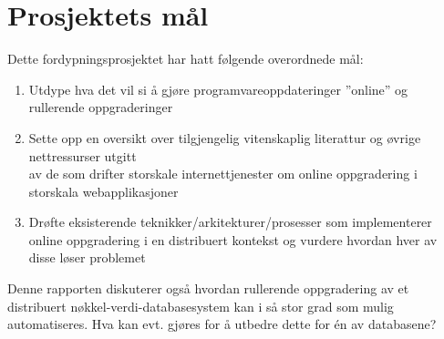 \section{Prosjektets mål}

Dette fordypningsprosjektet har hatt følgende overordnede mål:

\begin{enumerate}
  \item Utdype hva det vil si å gjøre programvareoppdateringer ''online'' og rullerende oppgraderinger %
  \item Sette opp en oversikt over tilgjengelig vitenskaplig literattur og øvrige nettressurser utgitt \\ av de som drifter storskale internettjenester om online oppgradering i storskala webapplikasjoner
  \item Drøfte eksisterende teknikker/arkitekturer/prosesser som implementerer \\ online oppgradering i en distribuert kontekst og vurdere hvordan hver av disse løser problemet
\end{enumerate}

Denne rapporten diskuterer også hvordan rullerende oppgradering av et distribuert nøkkel-verdi-databasesystem kan i så stor grad som mulig automatiseres. Hva kan evt. gjøres for å utbedre dette for én av databasene?










